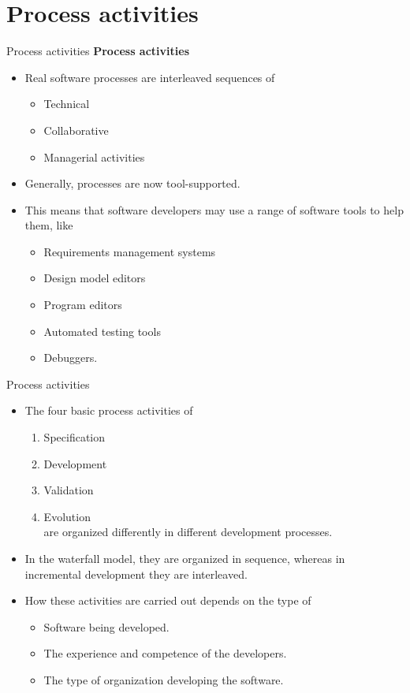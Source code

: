 \documentclass{beamer}
\begin{document}
\section{Process activities}
\begin{frame}{Process activities}
	\textbf{Process activities}
\begin{itemize}
	\item Real software processes are interleaved sequences of 
	\begin{itemize}
		\item Technical
		\item Collaborative
		\item Managerial activities 
	\end{itemize}
	\item Generally, processes are now tool-supported.
	\item This means that software developers may use a range of software tools to help them, like
	\begin{itemize}
		\item Requirements management systems
		\item Design model editors
		\item Program editors
		\item Automated testing tools
		\item Debuggers.
	\end{itemize}
\end{itemize}
\end{frame}
\begin{frame}{Process activities}
	\begin{itemize}
		\item The four basic process activities of
		\begin{enumerate}
			\item Specification
			\item Development
			\item Validation
			\item Evolution \\
			     are organized differently in different development processes. 
			
		\end{enumerate}
	\item In the waterfall model, they are organized in sequence, whereas in incremental development they are interleaved. 
	\item How these activities are carried out depends on the type of 
	\begin{itemize}
		\item Software being developed.
		\item The experience and competence of the developers.
		\item The type of organization developing the software.
	\end{itemize}
	\end{itemize}
\end{frame}
\end{document}
